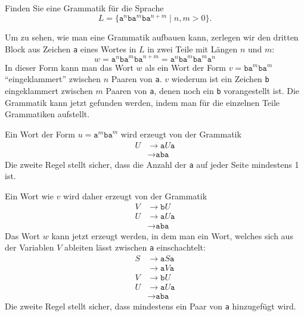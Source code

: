 Finden Sie eine Grammatik für die Sprache
\[
L=\{
\texttt{a}^n\texttt{ba}^m\texttt{ba}^{n+m}
\;|\; n,m>0
\}.
\]

\begin{loesung}
Um zu sehen, wie man eine Grammatik aufbauen kann, zerlegen wir den
dritten Block aus Zeichen \texttt{a} eines Wortes in $L$ in zwei
Teile mit Längen $n$ und $m$:
\[
w
=
\texttt{a}^n\texttt{ba}^m\texttt{ba}^{n+m}
=
\texttt{a}^n\texttt{ba}^m\texttt{ba}^m \texttt{a}^n
\]
In dieser Form kann man das Wort $w$ als ein Wort der Form
$v=\texttt{ba}^m\texttt{ba}^m$ ``eingeklammert'' zwischen $n$ Paaren von
\texttt{a}.
$v$ wiederum ist ein Zeichen \texttt{b} eingeklammert zwischen $m$ Paaren
von \texttt{a}, denen noch ein \texttt{b} vorangestellt ist.
Die Grammatik kann jetzt gefunden werden, indem man für die einzelnen
Teile Grammatiken aufstellt.

Ein Wort der Form $u=\texttt{a}^m\texttt{ba}^m$ wird erzeugt von der Grammatik
\begin{align*}
U&\to \texttt{a}U\texttt{a} \\
 &\to \texttt{aba}
\end{align*}
Die zweite Regel stellt sicher, dass die Anzahl der \texttt{a} auf jeder
Seite mindestens 1 ist.

Ein Wort wie $v$ wird daher erzeugt von der Grammatik
\begin{align*}
V&\to \texttt{b}U \\
U&\to \texttt{a}U\texttt{a} \\
 &\to \texttt{aba}
\end{align*}
Das Wort $w$ kann jetzt erzeugt werden, in dem man ein Wort, welches sich
aus der Variablen $V$ ableiten lässt zwischen \texttt{a} einschachtelt:
\begin{align*}
S&\to \texttt{a}S\texttt{a}\\
 &\to \texttt{a}V\texttt{a}\\
V&\to \texttt{b}U \\
U&\to \texttt{a}U\texttt{a} \\
 &\to \texttt{aba}
\end{align*}
Die zweite Regel stellt sicher, dass mindestens ein Paar von \texttt{a}
hinzugefügt wird.
\end{loesung}
